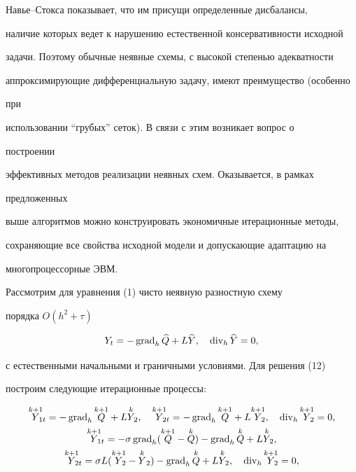 Навье--Стокса показывает, что им присущи определенные дисбалансы,


наличие которых ведет к нарушению естественной консервативности исходной


задачи. Поэтому обычные неявные схемы, с высокой степенью адекватности


аппроксимирующие дифференциальную задачу, имеют преимущество (особенно


при


использовании ``грубых'' сеток). В связи с этим возникает вопрос о


построении


эффективных методов реализации неявных схем. Оказывается, в рамках


предложенных


выше алгоритмов можно конструировать экономичные итерационные методы,


сохраняющие все свойства исходной модели и допускающие адаптацию на


многопроцессорные ЭВМ.





Рассмотрим для уравнения (1) чисто неявную разностную схему


порядка $O(h^2+\tau)$


\begin{equation}


Y_t=-\Grad_h\widehat Q+L\widehat Y,\quad


\Div_h\widehat Y=0,


\end{equation}


с естественными начальными и граничными условиями. Для решения (12)


построим следующие итерационные процессы:


\begin{gather}


\overset{k+1}{Y}_{\!\!\!1t} =-\Grad_h\overset{k+1}{Q}{}+


L\overset{k}{Y}_{\!2},\quad


\overset{k+1}{Y}_{\!\!\!2t} =-\Grad_h\overset{k+1}{Q}{}+


L\overset{k+1}{Y}_{\!\!\!2},\quad


\Div_h\overset{k+1}{Y}_{\!\!\!2} =0,\\


%


\overset{k+1}{Y}_{\!\!\!1t} =-\sigma\Grad_h(\overset{k+1}{Q}{}-


\overset{k}{Q}{})-\Grad_h\overset{k}{Q}{}+L\overset{k}{Y}_{\!2},\notag\\


%


\overset{k+1}{Y}_{\!\!\!2t} =


\sigma L(\overset{k+1}{Y}_{\!\!\!2}-\overset{k}{Y}{}_2)-


\Grad_h \overset{k}{Q}{}+L\overset{k}{Y}_{\!2},\quad


\Div_h \overset{k+1}{Y}_{\!\!\!2}=0,


\end{gather}


